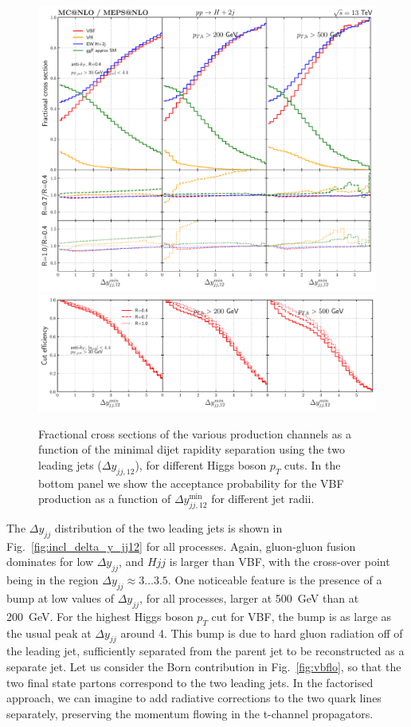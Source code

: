 \documentclass[10pt,prd,fleqn,superscriptaddress,notitlepage,nofootinbib,preprintnumbers,nobalancelastpage]{revtex4-1}
\newcommand{\VBF}{VBF\xspace}
\begin{document}
\begin{figure}[t]
  \centering
  \includegraphics[width=.65\textwidth]{figures/vbf/delta_y_jj12.pdf}
  \includegraphics[width=.65\textwidth]{figures/vbf/delta_y_jj12_frac.pdf}
\caption{Fractional cross sections of the various production channels as a function of the minimal dijet rapidity separation using the two leading jets ($\Delta y_{jj,12}$), for different Higgs boson $p_T$ cuts.
In the bottom panel we show the acceptance probability for the \VBF{} production as a function of $\Delta y_{jj,12}^{\min}$ for different jet radii.
}
\label{fig:incl_delta_y_jj12_fraction}
\end{figure}
The $\Delta y_{jj}$ distribution of the two leading jets is shown in Fig.~\ref{fig:incl_delta_y_jj12} for all processes.  Again, gluon-gluon fusion dominates for low $\Delta y_{jj}$, and $Hjj$ is larger than \VBF, with the cross-over point being in the region $\Delta y_{jj} \approx 3\ldots 3.5$.
One noticeable feature is the presence of a bump at low values of $\Delta y_{jj}$, for all processes,  larger at 500~GeV than at 200~GeV. For the highest Higgs boson $p_T$ cut for \VBF, the bump is as large as the usual peak at $\Delta y_{jj}$ around 4. This bump is due to hard gluon radiation off of the leading jet, sufficiently separated from the parent jet to be reconstructed as a separate jet. Let us consider the Born contribution in Fig.~\ref{fig:vbflo}, so that the two final state partons correspond to the two leading jets. In the factorised approach, we can imagine to add radiative corrections to the two quark lines separately, preserving the momentum flowing in the t-channel propagators.
\end{document}
